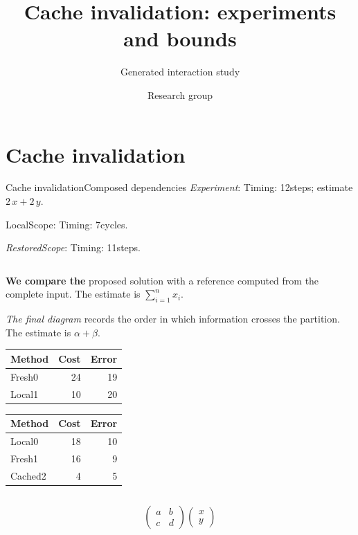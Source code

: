 \documentclass[9pt,aspectratio=169]{beamer}
\title{Cache invalidation: experiments and bounds}
\subtitle{Generated interaction study}
\author{Research group}
\date{}
\newcommand{\fuzzlayerA}[1]{\textit{#1}}
\newcommand{\fuzzlayerB}[1]{\fuzzlayerA{#1}}
\newcommand{\fuzzterm}[1]{\fuzzlayerB{#1}}
\newcommand{\fuzzpair}[2]{\fuzzterm{#1}: #2}
\newcommand{\fuzzunit}{steps}
\newcommand{\fuzzcoefficient}{2}
\newcommand{\fuzzscale}[2][\fuzzcoefficient]{#1\,#2}
\begin{document}
\section{Cache invalidation}
\begin{frame}[t,shrink=5]{Cache invalidation}{Composed dependencies}
\fuzzpair{Experiment}{Timing: 12\fuzzunit; estimate $\fuzzscale{x}+\fuzzscale[2]{y}$.}\par
{\renewcommand{\fuzzunit}{cycles}\let\fuzzterm\textrm\fuzzpair{LocalScope}{Timing: 7\fuzzunit.}\par}
\fuzzpair{RestoredScope}{Timing: 11\fuzzunit.}\par
\begin{columns}[onlytextwidth,b]
\begin{column}{0.46\textwidth}
\begin{description}
\item<1->[Stage 1] \textbf{We compare the} proposed solution with a reference computed from the complete input.  The estimate is $\sum_{i=1}^{n}x_i$.
\item<2->[Stage 2] \textit{The final diagram} records the order in which information crosses the partition.  The estimate is $\alpha+\beta$.
\item<2->[Stage 3] \begin{tabular}{lrr}Method&Cost&Error\\\hline
Fresh0&24&19\\
Local1&10&20\\
\end{tabular}
\end{description}
\par
\begin{flushright}
\begin{tabular}{lrr}Method&Cost&Error\\\hline
Local0&18&10\\
Fresh1&16&9\\
Cached2&4&5\\
\end{tabular}
\end{flushright}
\par
\begin{columns}[onlytextwidth,b]
\begin{column}{0.54\textwidth}
\[\begin{pmatrix}a&b\\c&d\end{pmatrix}\begin{pmatrix}x\\y\end{pmatrix}\]

\end{column}
\end{columns}
\end{column}
\end{columns}
\end{frame}
\end{document}
